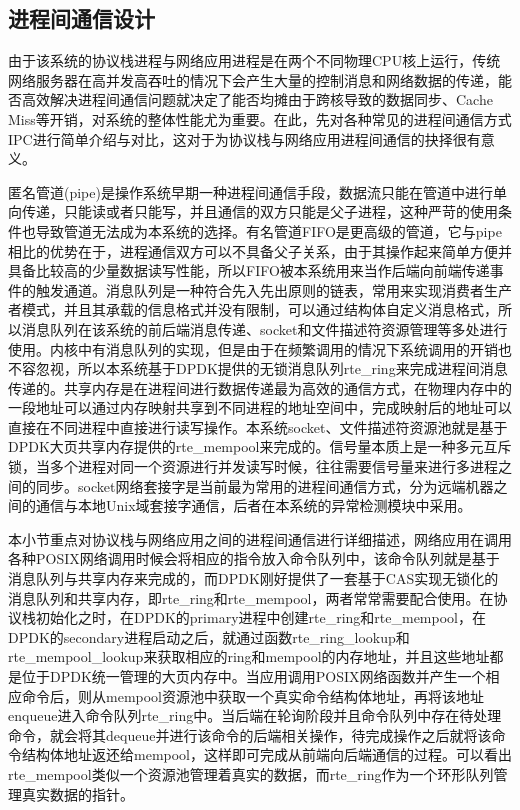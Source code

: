 \subsection{进程间通信设计}
由于该系统的协议栈进程与网络应用进程是在两个不同物理CPU核上运行，传统网络服务器在高并发高吞吐的情况下会产生大量的控制消息和网络数据的传递，能否高效解决进程间通信问题就决定了能否均摊由于跨核导致的数据同步、Cache Miss等开销，对系统的整体性能尤为重要。在此，先对各种常见的进程间通信方式IPC进行简单介绍与对比，这对于为协议栈与网络应用进程间通信的抉择很有意义。

匿名管道(pipe)是操作系统早期一种进程间通信手段，数据流只能在管道中进行单向传递，只能读或者只能写，并且通信的双方只能是父子进程，这种严苛的使用条件也导致管道无法成为本系统的选择。有名管道FIFO是更高级的管道，它与pipe相比的优势在于，进程通信双方可以不具备父子关系，由于其操作起来简单方便并具备比较高的少量数据读写性能，所以FIFO被本系统用来当作后端向前端传递事件的触发通道。消息队列是一种符合先入先出原则的链表，常用来实现消费者生产者模式，并且其承载的信息格式并没有限制，可以通过结构体自定义消息格式，所以消息队列在该系统的前后端消息传递、socket和文件描述符资源管理等多处进行使用。内核中有消息队列的实现，但是由于在频繁调用的情况下系统调用的开销也不容忽视，所以本系统基于DPDK提供的无锁消息队列rte\_ring来完成进程间消息传递的。共享内存是在进程间进行数据传递最为高效的通信方式，在物理内存中的一段地址可以通过内存映射共享到不同进程的地址空间中，完成映射后的地址可以直接在不同进程中直接进行读写操作。本系统socket、文件描述符资源池就是基于DPDK大页共享内存提供的rte\_mempool来完成的。信号量本质上是一种多元互斥锁，当多个进程对同一个资源进行并发读写时候，往往需要信号量来进行多进程之间的同步。socket网络套接字是当前最为常用的进程间通信方式，分为远端机器之间的通信与本地Unix域套接字通信，后者在本系统的异常检测模块中采用。

本小节重点对协议栈与网络应用之间的进程间通信进行详细描述，网络应用在调用各种POSIX网络调用时候会将相应的指令放入命令队列中，该命令队列就是基于消息队列与共享内存来完成的，而DPDK刚好提供了一套基于CAS实现无锁化的消息队列和共享内存，即rte\_ring和rte\_mempool，两者常常需要配合使用。在协议栈初始化之时，在DPDK的primary进程中创建rte\_ring和rte\_mempool，在DPDK的secondary进程启动之后，就通过函数rte\_ring\_lookup和rte\_mempool\_lookup来获取相应的ring和mempool的内存地址，并且这些地址都是位于DPDK统一管理的大页内存中。当应用调用POSIX网络函数并产生一个相应命令后，则从mempool资源池中获取一个真实命令结构体地址，再将该地址enqueue进入命令队列rte\_ring中。当后端在轮询阶段并且命令队列中存在待处理命令，就会将其dequeue并进行该命令的后端相关操作，待完成操作之后就将该命令结构体地址返还给mempool，这样即可完成从前端向后端通信的过程。可以看出rte\_mempool类似一个资源池管理着真实的数据，而rte\_ring作为一个环形队列管理真实数据的指针。

